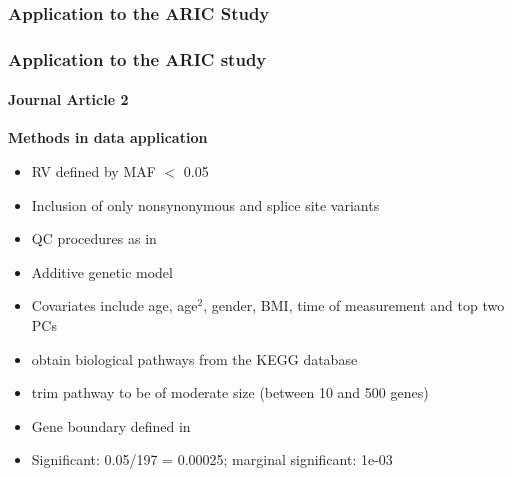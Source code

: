 \documentclass[compress]{beamer}
\begin{document}
\subsubsection{Application to the ARIC Study}
\begin{frame}[allowframebreaks]
\footnotesize
\frametitle{Application to the ARIC study}
\framesubtitle{Journal Article 2}
\footnotesize
\textbf{Methods in data application}
\begin{itemize}
\item RV defined by MAF $<$ 0.05
\item Inclusion of only nonsynonymous and splice site variants
\item QC procedures as in \cite{Peloso2014}
\item Additive genetic model
\item Covariates include age, age$^2$, gender, BMI, time of measurement and top two PCs
\item obtain biological pathways from the KEGG database \cite{Ogata1999}
\item trim pathway to be of moderate size (between 10 and 500 genes)
\item Gene boundary defined in \cite{Peloso2014}
\item Significant: 0.05/197 = 0.00025; marginal significant: 1e-03
\end{itemize}



\end{frame}
\end{document}
